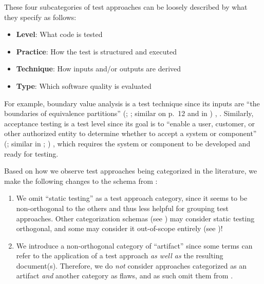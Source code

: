 These four subcategories
of test approaches can be loosely described by what they specify as
follows:
\begin{itemize}
    \item \textbf{Level}: What code is tested
    \item \textbf{Practice}: How the test is structured and executed
    \item \textbf{Technique}: How inputs and/or outputs are derived
    \item \textbf{Type}: Which software quality is evaluated
\end{itemize}
For example, boundary value analysis is a test technique since its inputs are
``the boundaries of equivalence partitions'' \ifnotpaper
    (\citealp[p.~2]{IEEE2022}; \citeyear[p.~1]{IEEE2021}; similar on p.~12 and
    in \citealpISTQB{})%
\else
    \cite[p.~2]{IEEE2022}, \cite[p.~1]{IEEE2021}%
\fi. Similarly, acceptance testing is a test level since its goal is to
``enable a user, customer, or other authorized entity to determine whether to
accept a system or component'' \ifnotpaper (\citealp[p.~5]{IEEE2017}; similar
    in \citeyear[p.~6]{IEEE2021}; \citealp[p.~344]{SakamotoEtAl2013})\else
    \cite[p.~5]{IEEE2017}\fi, which requires the system or component to be
developed and ready for testing.

Based on how we observe test approaches being categorized in the literature, we
make the following changes to the schema from \citet[Fig.~2]{IEEE2022}:

\begin{enumerate}
    \item We omit ``static testing'' as a test approach category, since it
          seems to be non-orthogonal to the others and thus less helpful for
          grouping test approaches. \ifnotpaper Other categorization schemas
              (see ) may consider static testing orthogonal, and
              some may consider it out-of-scope entirely (see )! \fi
    \item We introduce a non-orthogonal category of ``artifact''
          since some terms can refer to the application of a test approach
          \emph{as well as} the resulting document(s). Therefore, we do
          \emph{not} consider approaches categorized as an artifact \emph{and}
          another category as flaws, and as such omit them
          from .
\end{enumerate}

